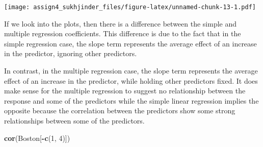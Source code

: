 \documentclass[]{article}
\newenvironment{Shaded}{\begin{snugshade}}{\end{snugshade}}
\newcommand{\KeywordTok}[1]{\textcolor[rgb]{0.13,0.29,0.53}{\textbf{#1}}}
\newcommand{\DecValTok}[1]{\textcolor[rgb]{0.00,0.00,0.81}{#1}}
\newcommand{\OperatorTok}[1]{\textcolor[rgb]{0.81,0.36,0.00}{\textbf{#1}}}
\newcommand{\NormalTok}[1]{#1}
\begin{document}
\texttt{[image: assign4\_sukhjinder\_files/figure-latex/unnamed-chunk-13-1.pdf]}

If we look into the plots, then there is a difference between the simple
and multiple regression coefficients. This difference is due to the fact
that in the simple regression case, the slope term represents the
average effect of an increase in the predictor, ignoring other
predictors.

In contrast, in the multiple regression case, the slope term represents
the average effect of an increase in the predictor, while holding other
predictors fixed. It does make sense for the multiple regression to
suggest no relationship between the response and some of the predictors
while the simple linear regression implies the opposite because the
correlation between the predictors show some strong relationships
between some of the predictors.

\begin{Shaded}
\begin{Highlighting}[]
\KeywordTok{cor}\NormalTok{(Boston[}\OperatorTok{-}\KeywordTok{c}\NormalTok{(}\DecValTok{1}\NormalTok{, }\DecValTok{4}\NormalTok{)])}
\end{Highlighting}
\end{Shaded}
\end{document}
